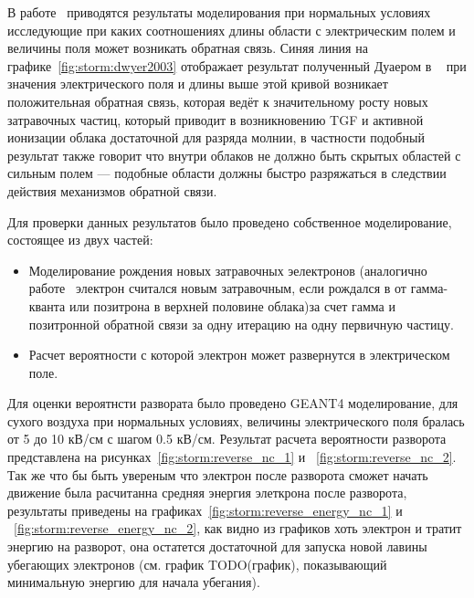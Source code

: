 В работе~\cite{dwyer2003fundamental} приводятся результаты моделирования при нормальных условиях исследующие при каких соотношениях длины области с электрическим полем и величины поля может возникать обратная связь. Синяя линия на графике~\ref{fig:storm:dwyer2003} отображает результат полученный Дуаером в ~\cite{dwyer2003fundamental} при значения электрического поля и длины выше этой кривой возникает положительная обратная связь, которая ведёт к значительному росту новых затравочных частиц, который приводит в возникновению TGF и активной ионизации облака достаточной для разряда молнии, в частности подобный результат также говорит что внутри облаков не должно быть скрытых областей с сильным полем --- подобные области должны быстро разряжаться в следствии действия механизмов обратной связи.

Для проверки данных результатов было проведено собственное моделирование, состоящее из двух частей:
\begin{itemize}
	\item Моделирование рождения новых затравочных эелектронов (аналогично работе~\cite{dwyer2003fundamental} электрон считался новым затравочным, если рождался в от гамма-кванта или позитрона в верхней половине облака)за счет гамма и позитронной обратной связи за одну итерацию на одну первичную частицу.
	\item Расчет вероятности с которой электрон может развернутся в электрическом поле. 
\end{itemize}
Для оценки вероятнсти развората было проведено GEANT4 моделирование, для сухого воздуха при нормальных условиях, величины электрического поля бралась от 5 до 10 кВ/см с шагом 0.5 кВ/см. Результат расчета вероятности разворота представлена на рисунках~\ref{fig:storm:reverse_nc_1} и ~\ref{fig:storm:reverse_nc_2}. Так же что бы быть увереным что электрон после разворота сможет начать движение была расчитанна средняя энергия элеткрона после разворота, результаты приведены на графиках~\ref{fig:storm:reverse_energy_nc_1} и ~\ref{fig:storm:reverse_energy_nc_2}, как видно из графиков хоть электрон и тратит энергию на разворот, она остатется достаточной для запуска новой лавины убегающих электронов (см. график TODO(график), показывающий минимальную энергию для начала убегания).  

